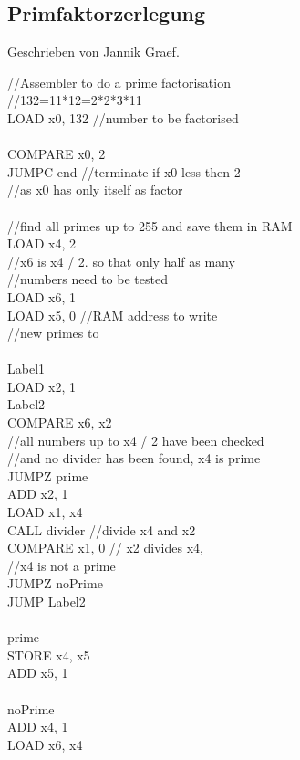 \documentclass[bibliography=totoc,listof=totoc,index=totoc]{scrartcl}
\begin{document}
\subsection{Primfaktorzerlegung}
Geschrieben von Jannik Graef.
\begin{multicols}{3}
\begin{small}
//Assembler to do a prime factorisation\\
//132=11*12=2*2*3*11\\
LOAD x0, 132 //number to be factorised\\
\\
COMPARE x0, 2\\
JUMPC end //terminate if x0 less then 2\\
//as x0 has only itself as factor\\
\\
//find all primes up to 255 and save them in RAM\\
LOAD x4, 2\\
//x6 is x4 / 2. so that only half as many\\
//numbers need to be tested\\
LOAD x6, 1\\
LOAD x5, 0 //RAM address to write\\
//new primes to\\
\\
Label1\\
LOAD x2, 1\\
Label2\\
COMPARE x6, x2\\
//all numbers up to x4 / 2 have been checked\\
//and no divider has been found, x4 is prime\\
JUMPZ prime\\
ADD x2, 1 \\
LOAD x1, x4\\
CALL divider //divide x4 and x2\\
COMPARE x1, 0 // x2 divides x4,\\
//x4 is not a prime\\
JUMPZ noPrime\\
JUMP Label2\\
\\
prime\\
STORE x4, x5\\
ADD x5, 1\\
\\
noPrime\\
ADD x4, 1\\
LOAD x6, x4\\

\end{small}
\end{multicols}
\end{document}
